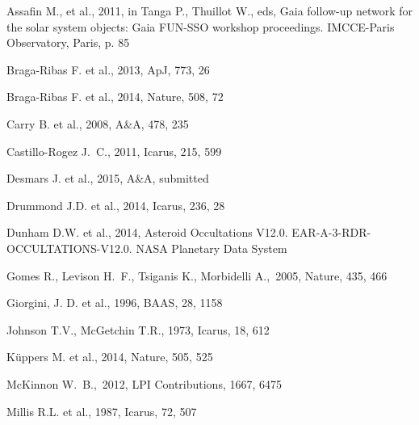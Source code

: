 \documentclass[useAMS,usenatbib]{mn2e}
\begin{document}
\begin{thebibliography}{99}

 Assafin M., et al., 2011, in Tanga P., Thuillot W., eds, Gaia follow-up network for the solar system objects: Gaia FUN-SSO workshop proceedings. IMCCE-Paris Observatory, Paris, p. 85

 Braga-Ribas F. et al., 2013,
ApJ, 773, 26

 Braga-Ribas F. et al., 2014,
Nature, 508, 72

 Carry B. et al., 2008,
A\&A, 478, 235

 Castillo-Rogez J.~C.,
2011, Icarus, 215, 599 

 Desmars J. et al., 2015, A\&A, submitted

 Drummond J.D. et al., 2014,
Icarus, 236, 28

Dunham D.W. et al., 2014, Asteroid Occultations V12.0. EAR-A-3-RDR-OCCULTATIONS-V12.0. NASA Planetary Data System

 Gomes R., Levison H.~F., Tsiganis K., Morbidelli A.,\ 2005, Nature, 435, 466 

 Giorgini, J. D. et al., 1996, BAAS, 28, 1158


 Johnson T.V., McGetchin T.R., 1973,
Icarus, 18, 612

 K\"{u}ppers M. et al., 2014,
Nature, 505, 525

 McKinnon W.~B.,\ 2012, LPI 
Contributions, 1667, 6475 

 Millis R.L. et al., 1987,
Icarus, 72, 507


\end{thebibliography}
\end{document}
